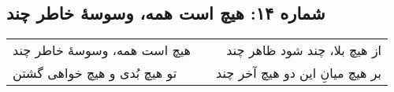 \begin{center}
\section*{شماره ۱۴: هیچ است همه، وسوسۀ خاطر چند}
\label{sec:014}
\begin{longtable}{l p{0.5cm} r}
هیچ است همه، وسوسهٔ خاطر چند
&&
از هیچ بلا، چند شود ظاهر چند
\\
تو هیچ بُدی و هیچ خواهی گشتن
&&
بر هیچ میانِ این دو هیچ آخر چند
\\
\end{longtable}
\end{center}
